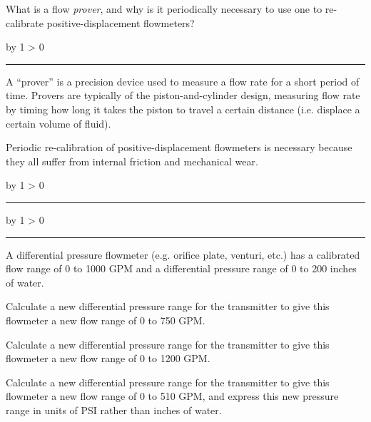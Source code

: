 \documentclass[12pt,a4paper]{article}
\def\oppgave{
            \advance\questnum by 1
            \ifnum \questnum > 0
                 \hrule
                 \vskip 3pt
                 \leftline{Oppgave \the\questnum}
                 \vskip 3pt \fi}
\def\svar{
           \advance\answnum by 1
           \ifnum \answnum > 0
                \hrule
                \vskip 3pt
                \leftline{Svar \the\answnum}
                \vskip 3pt \fi}
\def\notes{
           \advance\explnum by 1
           \ifnum \explnum > 0
                \hrule
                \vskip 3pt
                \leftline{Notes \the\explnum}
                \vskip 3pt \fi}
\begin{document}
What is a flow {\it prover}, and why is it periodically necessary to use one to re-calibrate positive-displacement flowmeters?

\vskip 10pt \filbreak 





\svar{} 

A ``prover'' is a precision device used to measure a flow rate for a short period of time.  Provers are typically of the piston-and-cylinder design, measuring flow rate by timing how long it takes the piston to travel a certain distance (i.e. displace a certain volume of fluid).

Periodic re-calibration of positive-displacement flowmeters is necessary because they all suffer from internal friction and mechanical wear.

\vskip 10pt \filbreak 





\notes{} 



\vfil \eject 



\oppgave{} 

A differential pressure flowmeter (e.g. orifice plate, venturi, etc.) has a calibrated flow range of 0 to 1000 GPM and a differential pressure range of 0 to 200 inches of water.

\vskip 10pt

Calculate a new differential pressure range for the transmitter to give this flowmeter a new flow range of 0 to 750 GPM.

\vskip 10pt

Calculate a new differential pressure range for the transmitter to give this flowmeter a new flow range of 0 to 1200 GPM.

\vskip 10pt

Calculate a new differential pressure range for the transmitter to give this flowmeter a new flow range of 0 to 510 GPM, and express this new pressure range in units of PSI rather than inches of water.

\vskip 10pt \filbreak 
\end{document}
